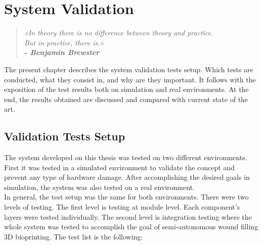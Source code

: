 \chapter{System Validation}
\label{cha:system_validation}

\begin{quotation}
\begin{flushright}
\itshape
«In theory there is no difference between theory and practice.\\ But in practice, there is.»\\
\textbf{- Benjamin Brewster}
\end{flushright}
\end{quotation}

The present chapter describes the system validation tests setup. Which tests are conducted, what they consist in, and why are they important. It follows with the exposition of the test results both on simulation and real environments. At the end, the results obtained are discussed and compared with current state of the art.


\section{Validation Tests Setup}
\label{sec:system_validation_tests_setup}

The system developed on this thesis was tested on two different environments. First it was tested in a simulated environment to validate the concept and prevent any type of hardware damage. After accomplishing the desired goals in simulation, the system was also tested on a real environment.\\

In general, the test setup was the same for both environments. There were two levels of testing. The first level is testing at module level. Each component's layers were tested individually. The second level is integration testing where the whole system was tested to accomplish the goal of semi-autonomous wound filling 3D bioprinting. The test list is the following:

